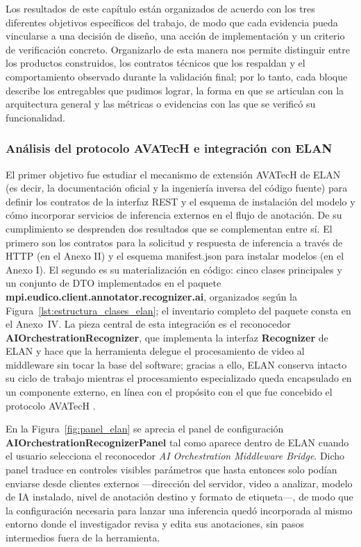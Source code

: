 \documentclass[11pt,a4paper]{article}
\begin{document}
Los resultados de este capítulo están organizados de acuerdo con los tres diferentes objetivos específicos del trabajo, de modo que cada evidencia pueda vincularse a una decisión de diseño, una acción de implementación y un criterio de verificación concreto. Organizarlo de esta manera nos permite distinguir entre los productos construidos, los contratos técnicos que los respaldan y el comportamiento observado durante la validación final; por lo tanto, cada bloque describe los entregables que pudimos lograr, la forma en que se articulan con la arquitectura general y las métricas o evidencias con las que se verificó su funcionalidad.

\subsubsection{Análisis del protocolo AVATecH e integración con ELAN}

El primer objetivo fue estudiar el mecanismo de extensión AVATecH de ELAN (es decir, la documentación oficial y la ingeniería inversa del código fuente) para definir los contratos de la interfaz REST y el esquema de instalación del modelo y cómo incorporar servicios de inferencia externos en el flujo de anotación. De su cumplimiento se desprenden dos resultados que se complementan entre sí. El primero son los contratos para la solicitud y respuesta de inferencia a través de HTTP (en el Anexo II) y el esquema manifest.json para instalar modelos (en el Anexo I). El segundo es su materialización en código: cinco clases principales y un conjunto de DTO implementados en el paquete \textbf{mpi.eudico.\allowbreak{}client.\allowbreak{}annotator.\allowbreak{}recognizer.\allowbreak{}ai}, organizados según la Figura~\ref{lst:estructura_clases_elan}; el inventario completo del paquete consta en el Anexo~IV. La pieza central de esta integración es el reconocedor \textbf{AIOrchestrationRecognizer}, que implementa la interfaz \textbf{Recognizer} de ELAN y hace que la herramienta delegue el procesamiento de video al middleware sin tocar la base del software; gracias a ello, ELAN conserva intacto su ciclo de trabajo mientras el procesamiento especializado queda encapsulado en un componente externo, en línea con el propósito con el que fue concebido el protocolo AVATecH \cite{auer2014avatech}.

En la Figura~\ref{fig:panel_elan} se aprecia el panel de configuración \textbf{AIOrchestrationRecognizerPanel} tal como aparece dentro de ELAN cuando el usuario selecciona el reconocedor \textit{AI Orchestration Middleware Bridge}. Dicho panel traduce en controles visibles parámetros que hasta entonces solo podían enviarse desde clientes externos ---dirección del servidor, video a analizar, modelo de IA instalado, nivel de anotación destino y formato de etiqueta---, de modo que la configuración necesaria para lanzar una inferencia quedó incorporada al mismo entorno donde el investigador revisa y edita sus anotaciones, sin pasos intermedios fuera de la herramienta.
\end{document}
